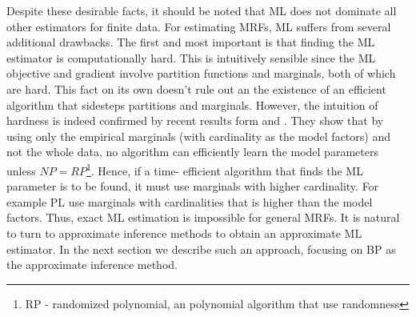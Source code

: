 Despite these desirable facts, it should be noted that ML does not dominate all other estimators for finite data. For estimating MRFs, ML suffers from several
additional drawbacks. The first and most important is that finding the ML estimator is computationally hard. This is intuitively sensible since the ML objective and gradient involve partition functions and marginals, both of which are hard. This fact on its own doesn't rule out an the existence of an efficient algorithm that sidesteps partitions and marginals.
However, the intuition of hardness is indeed confirmed by recent results form \cite{bresler2014hardness} and \cite{montanari2015computational}.
They show that by using only the empirical marginals (with cardinality as the model factors) and not the whole data, no algorithm can efficiently learn the model parameters unless  $NP = RP$\footnote{RP - randomized polynomial, an polynomial algorithm that use randomness}.
Hence, if a time- efficient algorithm that finds the ML parameter is to be found, it must use marginals with higher cardinality.
For example PL use marginals with cardinalities that is higher than the model factors.
Thus, exact ML estimation is impossible for general MRFs. It is natural to turn to approximate inference methods to obtain an approximate ML estimator.
In the next section we describe such an approach, focusing on BP as the approximate inference method.

